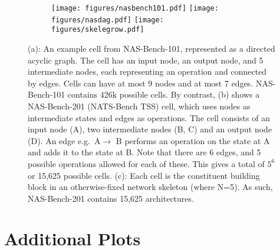 \documentclass{article}
\begin{document}
\begin{figure}[!h]
        \begin{subfigure}[b]{0.5\textwidth}
        \centering
         \texttt{[image: figures/nasbench101.pdf]}
            \label{fig:nasdag101}
                \texttt{[image: figures/nasdag.pdf]}
                \label{fig:nasdag201}
                \texttt{[image: figures/skelegrow.pdf]}
                \label{fig:skelegrow}
       \end{subfigure}

\caption{(a): An example cell from NAS-Bench-101, represented as a directed acyclic graph. The cell has an input node, an output node, and 5 intermediate nodes, each representing an operation and connected by edges. Cells can have at most 9 nodes and at most 7 edges. NAS-Bench-101 contains 426k possible cells. By contrast, (b) shows a NAS-Bench-201 (NATS-Bench TSS) cell, which uses nodes as intermediate states and edges as operations. The cell consists of an input node (A), two intermediate nodes (B, C) and an output node (D). An edge e.g.\ A$\rightarrow$ B performs an operation on the state at A and adds it to the state at B. Note that there are 6 edges, and 5 possible operations allowed for each of these. This gives a total of $5^6$ or 15,625 possible cells. (c): Each cell is the constituent building block in an otherwise-fixed network skeleton (where N=5). As such, NAS-Bench-201 contains 15,625 architectures.}
\label{fig:test}
\end{figure}


\clearpage
\onecolumn
\section{Additional Plots}
\label{appendix:plots}
\end{document}
